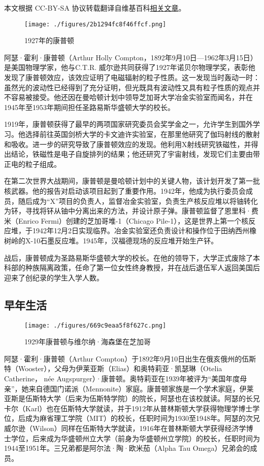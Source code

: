 
本文根据 CC-BY-SA 协议转载翻译自维基百科\href{https://en.wikipedia.org/wiki/Arthur_Compton}{相关文章}。

\begin{figure}[ht]
\centering
\texttt{[image: ./figures/2b1294fc8f46ffcf.png]}
\caption{1927年的康普顿} \label{fig_KPD_1}
\end{figure}
阿瑟·霍利·康普顿（Arthur Holly Compton，1892年9月10日—1962年3月15日）是美国物理学家，他与C.T.R. 威尔逊共同获得了1927年诺贝尔物理学奖，表彰他发现了康普顿效应，该效应证明了电磁辐射的粒子性质。这一发现当时轰动一时：虽然光的波动性已经得到了充分证明，但光既具有波动性又具有粒子性质的观点并不容易被接受。他还因在曼哈顿计划中领导芝加哥大学冶金实验室而闻名，并在1945年至1953年期间担任圣路易斯华盛顿大学的校长。

1919年，康普顿获得了最早的两项国家研究委员会奖学金之一，允许学生到国外学习。他选择前往英国剑桥大学的卡文迪许实验室，在那里他研究了伽玛射线的散射和吸收。进一步的研究导致了康普顿效应的发现。他利用X射线研究铁磁性，并得出结论，铁磁性是电子自旋排列的结果；他还研究了宇宙射线，发现它们主要由带正电的粒子组成。

在第二次世界大战期间，康普顿是曼哈顿计划中的关键人物，该计划开发了第一批核武器。他的报告对启动该项目起到了重要作用。1942年，他成为执行委员会成员，随后成为“X”项目的负责人，监督冶金实验室，负责生产核反应堆以将铀转化为钚，寻找将钚从铀中分离出来的方法，并设计原子弹。康普顿监督了恩里科·费米（Enrico Fermi）创建的芝加哥堆-1（Chicago Pile-1），这是世界上第一个核反应堆，于1942年12月2日实现临界。冶金实验室还负责设计和操作位于田纳西州橡树岭的X-10石墨反应堆。1945年，汉福德现场的反应堆开始生产钚。

战后，康普顿成为圣路易斯华盛顿大学的校长。在他的领导下，大学正式废除了本科部的种族隔离政策，任命了第一位女性终身教授，并在战后退伍军人返回美国后迎来了创纪录的学生入学人数。
\subsection{早年生活}
\begin{figure}[ht]
\centering
\texttt{[image: ./figures/669c9eaa5f8f627c.png]}
\caption{1929年康普顿与维尔纳·海森堡在芝加哥} \label{fig_KPD_2}
\end{figure}
阿瑟·霍利·康普顿（Arthur Compton）于1892年9月10日出生在俄亥俄州的伍斯特（Wooster），父母为伊莱亚斯（Elias）和奥特莉亚·凯瑟琳（Otelia Catherine， née Augspurger）·康普顿。奥特莉亚在1939年被评为“美国年度母亲”，她来自德国门诺派（Mennonite）家庭。康普顿家族是一个学术家庭，伊莱亚斯是伍斯特大学（后来为伍斯特学院）的院长，阿瑟也在该校就读。阿瑟的长兄卡尔（Karl）也在伍斯特大学就读，并于1912年从普林斯顿大学获得物理学博士学位，后成为麻省理工学院（MIT）的校长，任职时间为1930至1948年。阿瑟的次兄威尔逊（Wilson）同样在伍斯特大学就读，1916年在普林斯顿大学获得经济学博士学位，后来成为华盛顿州立大学（前身为华盛顿州立学院）的校长，任职时间为1944至1951年。三兄弟都是阿尔法·陶·欧米茄（Alpha Tau Omega）兄弟会的成员。

